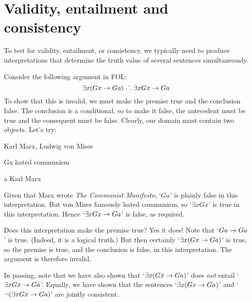 \section{Validity, entailment and consistency}
To test for validity, entailment, or consistency, we typically need to produce interpretations that determine the truth value of several sentences simultaneously. 

Consider the following argument in FOL:
$$\exists x(Gx \rightarrow Ga) \mathrel{\ldotp\dot{}\,\ldotp} \exists x Gx \rightarrow Ga$$
To show that this is invalid, we must make the premise true and the conclusion false. The conclusion is a conditional, so to make it false, the antecedent must be true and the consequent must be false. Clearly, our domain must contain two objects. Let's try:
	\begin{ekey}
		\item[\text{domain}] Karl Marx, Ludwig von Mises
		\item[Gx]  hated communism
		\item[a] Karl Marx
	\end{ekey}
Given that Marx wrote \emph{The Communist Manifesto}, `$Ga$' is plainly false in this interpretation. But von Mises famously hated communism, so `$\exists x Gx$' is true in this interpretation. Hence `$\exists x Gx \rightarrow Ga$' is false, as required. 

Does this interpretation make the premise true? Yes it does! Note that `$Ga \rightarrow Ga$' is true. (Indeed, it is a logical truth.) But then certainly `$\exists x (Gx \rightarrow Ga)$' is true, so the premise is true, and the conclusion is false, in this interpretation. The argument is therefore invalid. 

In passing, note that we have also shown that `$\exists x(Gx \rightarrow Ga)$' does \emph{not} entail `$\exists x Gx \rightarrow Ga$'. Equally, we have shown that the sentences `$\exists x (Gx \rightarrow Ga)$' and `$\neg (\exists x Gx \rightarrow Ga)$' are jointly consistent.

